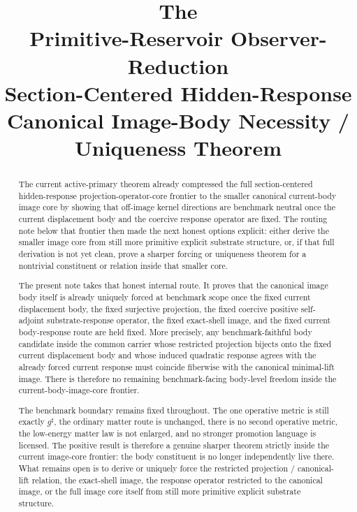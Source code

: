 \documentclass[11pt]{article}
\title{\textbf{The \TheoryName{}}\\[0.4em]
\large Primitive-Reservoir Observer-Reduction\\
\large Section-Centered Hidden-Response\\
\large Canonical Image-Body Necessity / Uniqueness Theorem}
\author{}
\date{}
\newcommand{\CompletedMetric}{g^{\sharp}}
\begin{document}
\maketitle

\begin{abstract}
The current active-primary theorem already compressed the full section-centered hidden-response projection-operator-core frontier to the smaller canonical current-body image core by showing that off-image kernel directions are benchmark neutral once the current displacement body and the coercive response operator are fixed. The routing note below that frontier then made the next honest options explicit: either derive the smaller image core from still more primitive explicit substrate structure, or, if that full derivation is not yet clean, prove a sharper forcing or uniqueness theorem for a nontrivial constituent or relation inside that smaller core.

The present note takes that honest internal route. It proves that the canonical image body itself is already uniquely forced at benchmark scope once the fixed current displacement body, the fixed surjective projection, the fixed coercive positive self-adjoint substrate-response operator, the fixed exact-shell image, and the fixed current body-response route are held fixed. More precisely, any benchmark-faithful body candidate inside the common carrier whose restricted projection bijects onto the fixed current displacement body and whose induced quadratic response agrees with the already forced current response must coincide fiberwise with the canonical minimal-lift image. There is therefore no remaining benchmark-facing body-level freedom inside the current-body-image-core frontier.

The benchmark boundary remains fixed throughout. The one operative metric is still exactly \(\CompletedMetric\), the ordinary matter route is unchanged, there is no second operative metric, the low-energy matter law is not enlarged, and no stronger promotion language is licensed. The positive result is therefore a genuine sharper theorem strictly inside the current image-core frontier: the body constituent is no longer independently live there. What remains open is to derive or uniquely force the restricted projection / canonical-lift relation, the exact-shell image, the response operator restricted to the canonical image, or the full image core itself from still more primitive explicit substrate structure.
\end{abstract}
\end{document}
